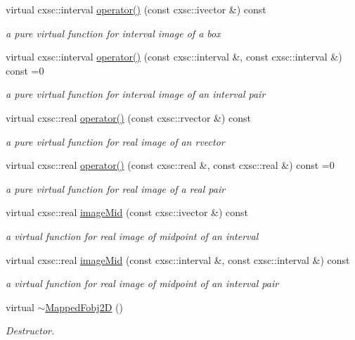 \begin{DoxyCompactItemize}
\item 
virtual cxsc\-::interval \hyperlink{classsubpavings_1_1MappedFobj2D_a2769e4d1fb4c4737df5355dde48367f1}{operator()} (const cxsc\-::ivector \&) const 
\begin{DoxyCompactList}\small\item\em a pure virtual function for interval image of a box \end{DoxyCompactList}\item 
virtual cxsc\-::interval \hyperlink{classsubpavings_1_1MappedFobj2D_a4d0e0e7b947a1657569040c8432b14e8}{operator()} (const cxsc\-::interval \&, const cxsc\-::interval \&) const =0
\begin{DoxyCompactList}\small\item\em a pure virtual function for interval image of an interval pair \end{DoxyCompactList}\item 
virtual cxsc\-::real \hyperlink{classsubpavings_1_1MappedFobj2D_a9a36235f9dc9fa415b96aaf59e2959ad}{operator()} (const cxsc\-::rvector \&) const 
\begin{DoxyCompactList}\small\item\em a pure virtual function for real image of an rvector \end{DoxyCompactList}\item 
virtual cxsc\-::real \hyperlink{classsubpavings_1_1MappedFobj2D_a0832e806f6ab166276fb238dd57ac2ad}{operator()} (const cxsc\-::real \&, const cxsc\-::real \&) const =0
\begin{DoxyCompactList}\small\item\em a pure virtual function for real image of a real pair \end{DoxyCompactList}\item 
virtual cxsc\-::real \hyperlink{classsubpavings_1_1MappedFobj2D_a2057e5a8f41416b136668dae17cfe7c3}{image\-Mid} (const cxsc\-::ivector \&) const 
\begin{DoxyCompactList}\small\item\em a virtual function for real image of midpoint of an interval \end{DoxyCompactList}\item 
virtual cxsc\-::real \hyperlink{classsubpavings_1_1MappedFobj2D_a7e78db53bfe096399c0b614c48215ebb}{image\-Mid} (const cxsc\-::interval \&, const cxsc\-::interval \&) const 
\begin{DoxyCompactList}\small\item\em a virtual function for real image of midpoint of an interval pair \end{DoxyCompactList}\item 
virtual \hyperlink{classsubpavings_1_1MappedFobj2D_a51599a1d3649c607393f5cb2d4727b51}{$\sim$\-Mapped\-Fobj2\-D} ()
\begin{DoxyCompactList}\small\item\em \-Destructor. \end{DoxyCompactList}\end{DoxyCompactItemize}


